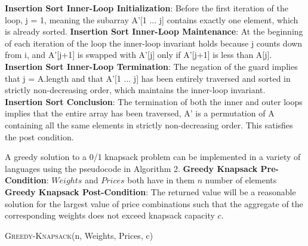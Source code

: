 \documentclass[onecolumn, 12pt, article]{IEEEtran}
\numberwithin{case}{problem}
\numberwithin{condition}{problem}
\numberwithin{condition}{subsection}
\numberwithin{definition}{section}
\theoremstyle{remark}
\numberwithin{question}{problem}
\theoremstyle{plain}
\numberwithin{answer}{problem}
\numberwithin{solution}{section}
\numberwithin{equation}{section}%
\begin{document}
\newline
\textbf{Insertion Sort Inner-Loop Initialization}: Before the first iteration of the loop, j = 1, meaning the subarray A'[1 ... j] contains exactly one element, which is already sorted.
\newline
\textbf{Insertion Sort Inner-Loop Maintenance}: At the beginning of each iteration of the loop the inner-loop invariant holds because j counts down from i, and A'[j+1] is swapped with A'[j] only if A'[j+1] is less than A[j].
\newline
\textbf{Insertion Sort Inner-Loop Termination}: The negation of the guard implies that j = A.length and that A'[1 ... j] has been entirely traversed and sorted in strictly non-decreasing order, which maintains the inner-loop invariant. 
\newline
\newline
\textbf{Insertion Sort Conclusion}: The termination of both the inner and outer loops implies that the entire array has been traversed, A' is a permutation of A containing all the same elements in strictly non-decreasing order. This satisfies the post condition.
\newline
\newline

A greedy solution to a 0/1 knapsack problem can be implemented in a variety of languages using the pseudocode in Algorithm 2.
\newline
\textbf{Greedy Knapsack Pre-Condition}: $Weights$ and $Prices$ both have in them $n$ number of elements
\newline
\textbf{Greedy Knapsack Post-Condition}: The returned value will be a reasonable solution for the largest value of price combinations such that the aggregate of the corresponding weights does not exceed knapsack capacity $c$.
\begin{algorithm}
\caption {\textsc{Greedy-Knapsack}(n, Weights, Prices, c)}
\label{algo:greedy}
\begin{algorithmic}[1]
\EndIf
{}
\EndIf
{}
\EndFor
{}
	\EndIf
\EndWhile
{}
\EndProcedure
\end{algorithmic}
\end{algorithm}
\newline
\newline
\newline
\end{document}
